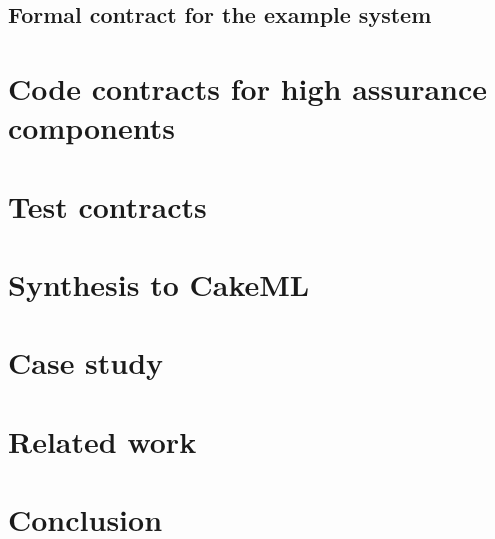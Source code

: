 \documentclass[global,twocolumn,keeplastbox]{svjour}
\newif\ifREVISIONS
\begin{document}
\subsection{Formal contract for the example system}


\section{Code contracts for high assurance components}
\label{sec:code-contracts}


\section{Test contracts}
\label{sec:testing}


\section{Synthesis to CakeML}
\label{sec:synthesis}


\section{Case study}
\label{sec:case-study}


\section{Related work}
\label{sec:related-work}


\ifREVISIONS
\subsection{Revisions}
\begin{compactitem}
  \item Add recent work published after 2018
\end{compactitem}
\fi

\section{Conclusion}
\label{sec:conclusion}


\clearpage



% 

% 
\end{document}
